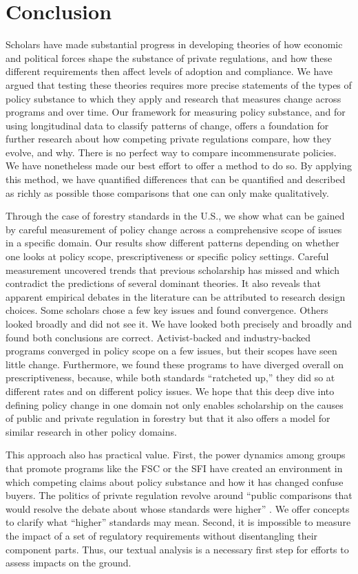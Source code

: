 \documentclass[
      12pt,
            Review ]{article}
\begin{document}
\section{Conclusion}\label{conclusion}

Scholars have made substantial progress in developing theories of how
economic and political forces shape the substance of private
regulations, and how these different requirements then affect levels of
adoption and compliance. We have argued that testing these theories
requires more precise statements of the types of policy substance to
which they apply and research that measures change across programs and
over time. Our framework for measuring policy substance, and for using
longitudinal data to classify patterns of change, offers a foundation
for further research about how competing private regulations compare,
how they evolve, and why. There is no perfect way to compare
incommensurate policies. We have nonetheless made our best effort to
offer a method to do so. By applying this method, we have quantified
differences that can be quantified and described as richly as possible
those comparisons that one can only make qualitatively.

Through the case of forestry standards in the U.S., we show what can be
gained by careful measurement of policy change across a comprehensive
scope of issues in a specific domain. Our results show different
patterns depending on whether one looks at policy scope,
prescriptiveness or specific policy settings. Careful measurement
uncovered trends that previous scholarship has missed and which
contradict the predictions of several dominant theories. It also reveals
that apparent empirical debates in the literature can be attributed to
research design choices. Some scholars chose a few key issues and found
convergence. Others looked broadly and did not see it. We have looked
both precisely and broadly and found both conclusions are correct.
Activist-backed and industry-backed programs converged in policy scope
on a few issues, but their scopes have seen little change. Furthermore,
we found these programs to have diverged overall on prescriptiveness,
because, while both standards ``ratcheted up,'' they did so at different
rates and on different policy issues. We hope that this deep dive into
defining policy change in one domain not only enables scholarship on the
causes of public and private regulation in forestry but that it also
offers a model for similar research in other policy domains.

This approach also has practical value. First, the power dynamics among
groups that promote programs like the FSC or the SFI have created an
environment in which competing claims about policy substance and how it
has changed confuse buyers. The politics of private regulation revolve
around ``public comparisons that would resolve the debate about whose
standards were higher'' \citep{Overdevest2010}. We offer concepts to
clarify what ``higher'' standards may mean. Second, it is impossible to
measure the impact of a set of regulatory requirements without
disentangling their component parts. Thus, our textual analysis is a
necessary first step for efforts to assess impacts on the ground.
\end{document}
